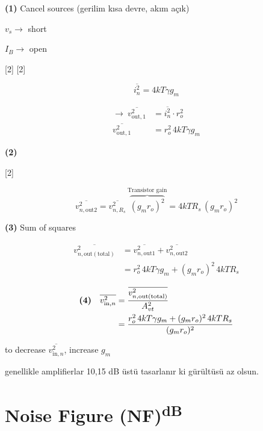 \documentclass[11pt,a4paper]{article}
\begin{document}
\textbf{(1)} Cancel sources (gerilim kısa devre, akım açık)

$v_s \rightarrow$ short

$I_B \rightarrow$ open

[2]
[2]

\[ \overline{i_n^2} = 4kT\gamma g_m \]

\begin{align*}
\rightarrow\ \overline{v_{\mathrm{out},1}^2} &= \overline{i_n^2}\cdot r_o^2 \\
\overline{v_{\mathrm{out},1}^2} &= r_o^2\,4kT\gamma g_m
\end{align*}

\textbf{(2)}

[2]

\[ \overline{v_{n,\mathrm{out}2}^2} = \overline{v_{n,R_s}^2}\,\overbrace{(g_m r_o)^2}^{\text{Transistor gain}} = 4kTR_s\,(g_m r_o)^2 \]

\textbf{(3)} Sum of squares

\begin{align*}
\overline{v_{n,\mathrm{out(total)}}^2} &= \overline{v_{n,\mathrm{out}1}^2} + \overline{v_{n,\mathrm{out}2}^2} \\
&= r_o^2\,4kT\gamma g_m + (g_m r_o)^2\,4kTR_s
\end{align*}

\begin{align*}
\text{\textbf{(4)}}\quad \overline{v_{\mathrm{in},n}^2} &= \frac{\overline{v_{n,\mathrm{out(total)}}^2}}{A_{vt}^2} \\
&= \frac{r_o^2\,4kT\gamma g_m + (g_m r_o)^2\,4kTR_s}{(g_m r_o)^2}
\end{align*}


to decrease $\overline{v_{\mathrm{in},n}^2}$, increase $g_m$

genellikle amplifierlar 10,15 dB üstü tasarlanır ki gürültüsü az olsun.

\section{Noise Figure (NF)\textsuperscript{dB}}
\end{document}
